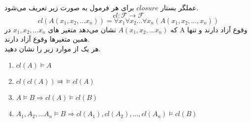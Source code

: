
	عملگر بستار 
	$closure$
	برای هر فرمول به صورت زیر تعریف ‌می‌شود. 
	$$cl : \mathcal{F} \longrightarrow \mathcal{F}$$
	$$
		cl(A(x_1, x_2, \dots x_n)) = \forall x_1 \forall x_2 \dots \forall x_n(A(x_1, x_2, \dots, x_n))
	$$
	که
	$A(x_1, x_2, \dots x_n)$
	نشان می‌دهد متغیر های 
	$x_1, x_2, \dots x_n$
	در A وقوع آزاد دارند و تنها همین متغیر‌ها وقوع آزاد دارند.\\
	هر یک از موارد زیر را نشان دهید.
	\begin{enumerate}[label = (\alph*]
		\LTR
		\item $cl(A) \vDash A$
		\item $cl(cl(A)) \Dashv\vDash cl(A)$
		\item $A \vDash B \Longrightarrow cl(A) \vDash cl(B)$
		\item $A_1, A_2, \dots A_n \vDash B \Longrightarrow cl(A_1), cl(A_2), \dots, cl(A_n) \vDash cl(B)$
	\end{enumerate}
